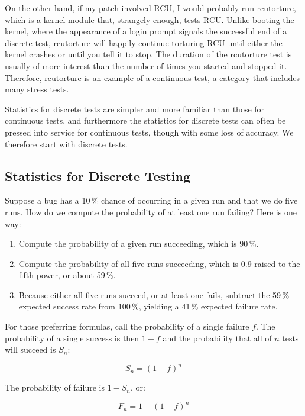 On the other hand, if my patch involved RCU, I would probably run
rcutorture, which is a kernel module that, strangely enough, tests RCU\@.
Unlike booting the kernel, where the appearance of a login prompt
signals the successful end of a discrete test, rcutorture will happily
continue torturing RCU until either the kernel crashes or until you
tell it to stop.
The duration of the rcutorture test is usually of more
interest than the number of times you started and stopped it.
Therefore, rcutorture is an example of a continuous test, a category
that includes many stress tests.

Statistics for discrete tests are simpler and more familiar than those
for continuous tests, and furthermore the statistics for discrete tests
can often be pressed into service for continuous tests, though with some
loss of accuracy.
We therefore start with discrete tests.

\subsection{Statistics for Discrete Testing}
\label{sec:debugging:Statistics for Discrete Testing}

Suppose a bug has a 10\,\% chance of occurring in a given run and that
we do five runs.
How do we compute the probability of at least one run failing?
Here is one way:

\begin{enumerate}
\item	Compute the probability of a given run succeeding, which is 90\,\%.
\item	Compute the probability of all five runs succeeding, which
	is 0.9 raised to the fifth power, or about 59\,\%.
\item	Because either all five runs succeed, or at least one fails,
	subtract the 59\,\% expected success rate from 100\,\%, yielding
	a 41\,\% expected failure rate.
\end{enumerate}

For those preferring formulas, call the probability of a single failure $f$.
The probability of a single success is then $1-f$ and the probability
that all of $n$ tests will succeed is $S_n$:

\begin{equation}
	S_n = \left(1-f\right)^n
\end{equation}

The probability of failure is $1-S_n$, or:

\begin{equation}
	F_n = 1-\left(1-f\right)^n
\label{eq:debugging:Binomial Failure Rate}
\end{equation}

